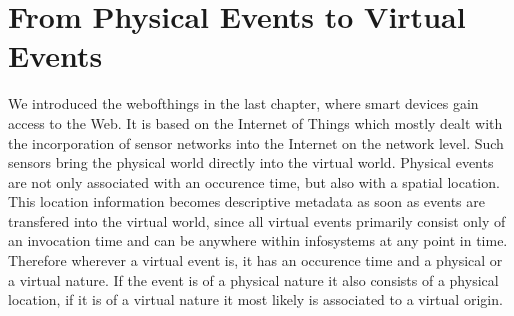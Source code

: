 \section{From Physical Events to Virtual Events}
We introduced the \textrm{\gls{webofthings}} in the last chapter, where smart devices gain access to the Web.
It is based on the \textrm{Internet of Things} which mostly dealt with the incorporation of sensor networks into the Internet on the network level.
Such sensors bring the physical world directly into the virtual world.
Physical events are not only associated with an occurence time, but also with a spatial location.
This location information becomes descriptive metadata as soon as events are transfered into the virtual world, since all virtual events primarily consist only of an invocation time and can be anywhere within \textrm{\glspl{infosystem}} at any point in time.
Therefore wherever a virtual event is, it has an occurence time and a physical or a virtual nature.
If the event is of a physical nature it also consists of a physical location, if it is of a virtual nature it most likely is associated to a virtual origin.




